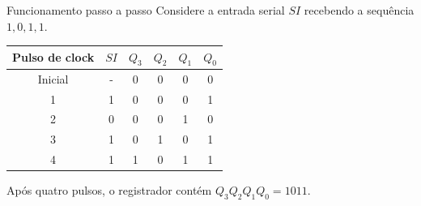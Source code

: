 \begin{frame}{Funcionamento passo a passo}
Considere a entrada serial \(SI\) recebendo a sequência \(1, 0, 1, 1\).

\begin{center}
\renewcommand{\arraystretch}{1.35}
\begin{tabular}{c|c|c|c|c|c}
Pulso de clock & \(SI\) & \(Q_3\) & \(Q_2\) & \(Q_1\) & \(Q_0\) \\
\hline
Inicial & - & 0 & 0 & 0 & 0 \\
1 & 1 & 0 & 0 & 0 & 1 \\
2 & 0 & 0 & 0 & 1 & 0 \\
3 & 1 & 0 & 1 & 0 & 1 \\
4 & 1 & 1 & 0 & 1 & 1 \\
\end{tabular}
\end{center}

Após quatro pulsos, o registrador contém \(Q_3Q_2Q_1Q_0 = 1011\).
\end{frame}